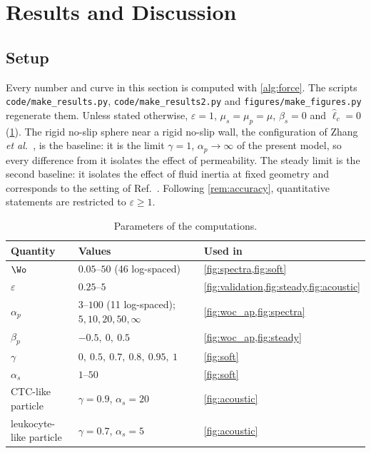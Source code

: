 \section{Results and Discussion}\label{sec:results}

\subsection{Setup}\label{sec:setup}
Every number and curve in this section is computed with \cref{alg:force}. The scripts \texttt{code/make\_results.py},
\texttt{code/make\_results2.py} and \texttt{figures/make\_figures.py} regenerate them. Unless stated otherwise,
$\varepsilon=1$, $\mu_s=\mu_p=\mu$, $\beta_s=0$ and $\hat\ell_c=0$ (\cref{tab:params}). The rigid no-slip sphere near a
rigid no-slip wall, the configuration of Zhang \emph{et al.}~\cite{zhang2023unsteady}, is the baseline: it is the limit
$\gamma=1$, $\alpha_p\to\infty$ of the present model, so every difference from it isolates the effect of
permeability. The steady limit is the second baseline: it isolates the effect of fluid inertia at fixed geometry and
corresponds to the setting of Ref.~. Following \cref{rem:accuracy}, quantitative
statements are restricted to $\varepsilon\ge1$.

\begin{table}[t]
\caption{Parameters of the computations.}
\label{tab:params}
\begin{ruledtabular}
\begin{tabular}{lll}
Quantity & Values & Used in\\
\hline
$\Wo$ & $0.05$--$50$ (46 log-spaced) & \cref{fig:spectra,fig:soft}\\
$\varepsilon$ & $0.25$--$5$ & \cref{fig:validation,fig:steady,fig:acoustic}\\
$\alpha_p$ & $3$--$100$ (11 log-spaced); $5,10,20,50,\infty$ & \cref{fig:woc_ap,fig:spectra}\\
$\beta_p$ & $-0.5,\ 0,\ 0.5$ & \cref{fig:woc_ap,fig:steady}\\
$\gamma$ & $0,\ 0.5,\ 0.7,\ 0.8,\ 0.95,\ 1$ & \cref{fig:soft}\\
$\alpha_s$ & $1$--$50$ & \cref{fig:soft}\\
CTC-like particle & $\gamma=0.9$, $\alpha_s=20$ & \cref{fig:acoustic}\\
leukocyte-like particle & $\gamma=0.7$, $\alpha_s=5$ & \cref{fig:acoustic}\\
\end{tabular}
\end{ruledtabular}
\end{table}

